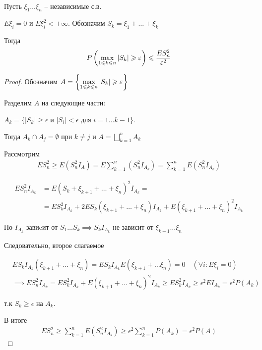 
\begin{lemma}~

  Пусть $\xi_1 \ldots \xi_n$ -- независимые с.в.

  $E \xi_i = 0$ и $E \xi_i^2 < +\infty$. 
  Обозначим $S_k = \xi_1 + \ldots + \xi_k$

  Тогда
  \begin{align*}
    P\left( \max_{1 \leqslant k \leqslant n}|S_k| \geqslant \varepsilon \right) \leqslant \frac{E S_n^2}{ \varepsilon^2}
  \end{align*}
\end{lemma}

\begin{proof}
  Обозначим $A = \left\{ \max\limits_{1 \leqslant k \leqslant n}{|S_k|} \geqslant \varepsilon  \right\}$
    
  Разделим $A$ на следующие части:

  $A_k = \{|S_k| \geq \epsilon $ и $|S_i| < \epsilon$ для $i = 1 \ldots k - 1\}$.

  Тогда $A_k \cap A_j = \emptyset$ при $k \neq j$ и $A = \bigsqcup\limits_{k = 1}^{n} A_k$

  Рассмотрим 
  \begin{align*}
    E S_n^2 \geq E(S_n^2 I_A) = E \sum_{k = 1}^{n} (S_n^2 I_{A_k}) = \sum_{k = 1}^n E(S_n^2 I_{A_k})
  \end{align*}

  \begin{align*}
    E S_n^2 I_{A_k} &= E(S_k + \xi_{k + 1} + \ldots + \xi_n)^2 I_{A_k} =\\
    &= E S_k^2 I_{A_k} + 2 E S_k (\xi_{k + 1} + \ldots + \xi_n) I_{A_k} + 
    E(\xi_{k + 1} + \ldots + \xi_n)^2 I_{A_k}
  \end{align*}

  Но $I_{A_k}$ завиcит от $S_1 \ldots S_k \implies S_k I_{A_k}$ 
  не зависит от $\xi_{k + 1} \ldots \xi_n$

  Следовательно, второе слагаемое

  \begin{align*}
    &E S_k I_{A_k} (\xi_{k + 1} + \ldots + \xi_n) = 
    E S_k I_{A_k} E(\xi_{k + 1} + \ldots \xi_n) = 0 \quad (\forall i: E \xi_i = 0)\\
    &\implies E S_n^2 I_{A_k} = E S_k^2 I_{A_k} + E(\xi_{k + 1} + \ldots + \xi_n)^2 I_{A_k} 
    \geq E S_k^2 I_{A_k} \geq \epsilon^ 2 E I_{A_k} = \epsilon^2 P(A_k)
  \end{align*}

  т.к $S_k \geq \epsilon$ на $A_k$.

  В итоге
  \begin{align*}
    E S_n^2 \geq \sum_{k = 1}^{n} E (S_n^2 I_{A_k}) \geq 
    \epsilon^2 \sum_{k = 1}^{n} P(A_k) = \epsilon^2 P(A)
  \end{align*}
\end{proof}

